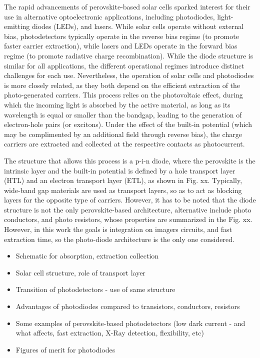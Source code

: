 The rapid advancements of perovskite-based solar cells sparked interest for their use in alternative optoelectronic applications, including photodiodes, light-emitting diodes (LEDs), and lasers. While solar cells operate without external bias, photodetectors typically operate in the reverse bias regime (to promote faster carrier extraction), while lasers and LEDs operate in the forward bias regime (to promote radiative charge recombination). While the diode structure is similar for all applications, the different operational regimes introduce distinct challenges for each use. Nevertheless, the operation of solar cells and photodiodes is more closely related, as they both depend on the efficient extraction of the photo-generated carriers. This process relies on the photovoltaic effect, during which the incoming light is absorbed by the active material, as long as its wavelength is equal or smaller than the bandgap, leading to the generation of electron-hole pairs (or excitons). Under the effect of the built-in potential (which may be complimented by an additional field through reverse bias), the charge carriers are extracted and collected at the respective contacts as photocurrent. 

The structure that allows this process is a p-i-n diode, where the perovskite is the intrinsic layer and the built-in potential is defined by a hole transport layer (HTL) and an electron transport layer (ETL), as shown in Fig. xx. Typically, wide-band gap materials are used as transport layers, so as to act as blocking layers for the opposite type of carriers. However, it has to be noted that the diode structure is not the only perovskite-based architecture, alternative include photo conductors, and photo resistors, whose properties are summarized in the Fig. xx. However, in this work the goals is integration on imagers circuits, and fast extraction time, so the photo-diode architecture is the only one considered. 




\begin{itemize}
    \item Schematic for absorption, extraction collection
    \item Solar cell structure, role of transport layer
    \item Transition of photodetectors - use of same structure 
    \item Advantages of photodiodes compared to transistors, conductors, resistors 
    \item Some examples of perovskite-based photodetectors (low dark current - and what affects, fast extraction, X-Ray detection, flexibility, etc)
    \item Figures of merit for photodiodes 
\end{itemize}

